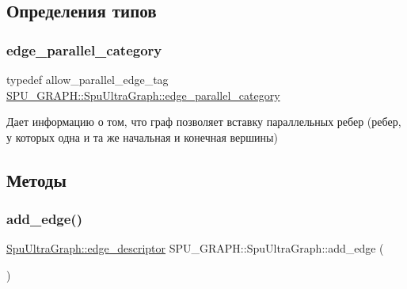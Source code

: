 \subsection{Определения типов}
\mbox{\label{class_s_p_u___g_r_a_p_h_1_1_spu_ultra_graph_a6ae78f833e62e7fddd57b9c466e75255}} 
\subsubsection{\texorpdfstring{edge\+\_\+parallel\+\_\+category}{edge\_parallel\_category}}
{\footnotesize\ttfamily typedef allow\+\_\+parallel\+\_\+edge\+\_\+tag \hyperlink{class_s_p_u___g_r_a_p_h_1_1_spu_ultra_graph_a6ae78f833e62e7fddd57b9c466e75255}{S\+P\+U\+\_\+\+G\+R\+A\+P\+H\+::\+Spu\+Ultra\+Graph\+::edge\+\_\+parallel\+\_\+category}}

Дает информацию о том, что граф позволяет вставку параллельных ребер (ребер, у которых одна и та же начальная и конечная вершины) 

\subsection{Методы}
\mbox{\label{class_s_p_u___g_r_a_p_h_1_1_spu_ultra_graph_a5d1dccd777a9686e72b775ebc3151936}} 
\subsubsection{\texorpdfstring{add\+\_\+edge()}{add\_edge()}\hspace{0.1cm}{\footnotesize\ttfamily [1/7]}}
{\footnotesize\ttfamily \hyperlink{class_s_p_u___g_r_a_p_h_1_1_spu_ultra_graph_a5f3776e003ef0a1648f1d9f84289810b}{Spu\+Ultra\+Graph\+::edge\+\_\+descriptor} S\+P\+U\+\_\+\+G\+R\+A\+P\+H\+::\+Spu\+Ultra\+Graph\+::add\+\_\+edge (\begin{DoxyParamCaption}{ }\end{DoxyParamCaption})}

